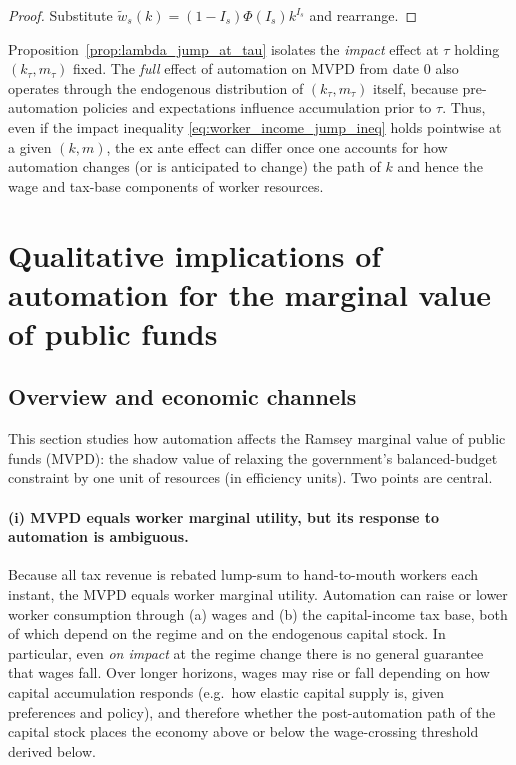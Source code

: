 \documentclass{article}
\begin{document}
\begin{proof}
Substitute $\tilde w_s(k)=(1-I_s)\Phi(I_s)k^{I_s}$ and rearrange.
\end{proof}

\begin{remark}
\label{rem:full_effects_vs_impact}
Proposition~\ref{prop:lambda_jump_at_tau} isolates the \emph{impact} effect at $\tau$ holding $(k_\tau,m_\tau)$ fixed. The \emph{full} effect of automation on MVPD from date $0$ also operates through the endogenous distribution of $(k_\tau,m_\tau)$ itself, because pre-automation policies and expectations influence accumulation prior to $\tau$. Thus, even if the impact inequality \eqref{eq:worker_income_jump_ineq} holds pointwise at a given $(k,m)$, the ex ante effect can differ once one accounts for how automation changes (or is anticipated to change) the path of $k$ and hence the wage and tax-base components of worker resources.
\end{remark}



\section{Qualitative implications of automation for the marginal value of public funds}
\label{sec:mvpf}

\subsection{Overview and economic channels}
\label{sec:mvpf_overview}

This section studies how automation affects the Ramsey marginal value of public funds (MVPD): the shadow value of relaxing the government's balanced-budget constraint by one unit of resources (in efficiency units). Two points are central.

\paragraph{(i) MVPD equals worker marginal utility, but its response to automation is ambiguous.}
Because all tax revenue is rebated lump-sum to hand-to-mouth workers each instant, the MVPD equals worker marginal utility. Automation can raise or lower worker consumption through (a) wages and (b) the capital-income tax base, both of which depend on the regime and on the endogenous capital stock. In particular, even \emph{on impact} at the regime change there is no general guarantee that wages fall. Over longer horizons, wages may rise or fall depending on how capital accumulation responds (e.g.\ how elastic capital supply is, given preferences and policy), and therefore whether the post-automation path of the capital stock places the economy above or below the wage-crossing threshold derived below.
\end{document}
